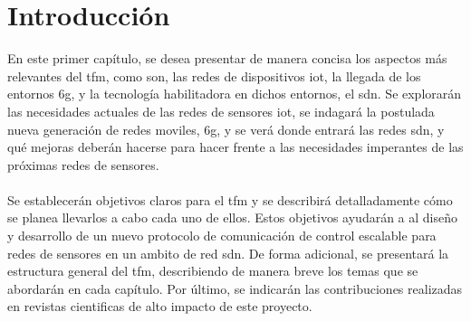 
\chapter{Introducción}
\label{ch:intro}

\par
En este primer capítulo, se desea presentar de manera concisa los aspectos más relevantes del \gls{tfm}, como son, las redes de dispositivos \gls{iot}, la llegada de los entornos \gls{6g}, y la tecnología habilitadora en dichos entornos, el \gls{sdn}. Se explorarán las necesidades actuales de las redes de sensores \gls{iot}, se indagará la postulada nueva generación de redes moviles, \gls{6g}, y se verá donde entrará las redes \gls{sdn}, y qué mejoras deberán hacerse para hacer frente a las necesidades imperantes de las próximas redes de sensores.\\
\\
Se establecerán objetivos claros para el \gls{tfm} y se describirá detalladamente cómo se planea llevarlos a cabo cada uno de ellos. Estos objetivos ayudarán a al diseño y desarrollo de un nuevo protocolo de comunicación de control escalable para redes de sensores en un ambito de red \gls{sdn}. De forma adicional, se presentará la estructura general del \gls{tfm}, describiendo de manera breve los temas que se abordarán en cada capítulo. Por último, se indicarán las contribuciones realizadas en revistas cientificas de alto impacto de este proyecto.

